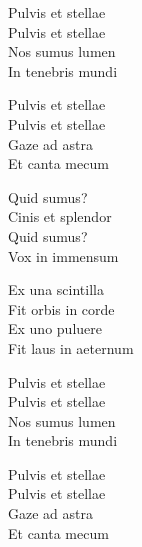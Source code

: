 \begin{lyrics}
Pulvis et stellae\\
Pulvis et stellae\\
Nos sumus lumen\\
In tenebris mundi

Pulvis et stellae\\
Pulvis et stellae\\
Gaze ad astra\\
Et canta mecum

Quid sumus?\\
Cinis et splendor\\
Quid sumus?\\
Vox in immensum

Ex una scintilla\\
Fit orbis in corde\\
Ex uno puluere\\
Fit laus in aeternum

Pulvis et stellae\\
Pulvis et stellae\\
Nos sumus lumen\\
In tenebris mundi

Pulvis et stellae\\
Pulvis et stellae\\
Gaze ad astra\\
Et canta mecum
\end{lyrics}


